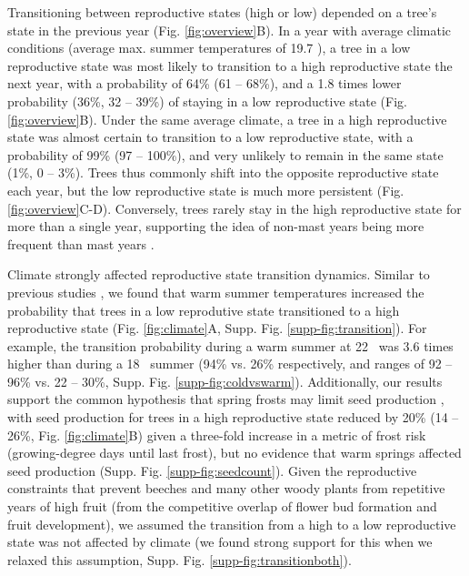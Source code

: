 \documentclass[11pt]{article}
\begin{document}
Transitioning between reproductive states (high or low) depended on a tree's state in the previous year (Fig. \ref{fig:overview}B).  In a year with average climatic conditions (average max. summer temperatures of 19.7 \celsius), a tree in a low reproductive state was most likely to transition to a high reproductive state the next year, with a probability of 64\% (61 -- 68\%), and a 1.8 times lower probability (36\%, 32 -- 39\%) of staying in a low reproductive state (Fig. \ref{fig:overview}B).
Under the same average climate, a tree in a high reproductive state was almost certain to transition to a low reproductive state, with a probability of 99\% (97 -- 100\%), and very unlikely to remain in the same state (1\%, 0 -- 3\%). 
Trees thus commonly shift into the opposite reproductive state each year, but the low reproductive state is much more persistent (Fig. \ref{fig:overview}C-D). 
Conversely, trees rarely stay in the high reproductive state for more than a single year, supporting the idea of non-mast years being more frequent than mast years \citep{Kelly1994}. 

Climate strongly affected reproductive state transition dynamics. Similar to previous studies \citep{Nussbaumer2018, Vacchiano2017, Journe2024}, we found that warm summer temperatures increased the probability that trees in a low reprodutive state transitioned to a high reproductive state (Fig. \ref{fig:climate}A, Supp. Fig. \ref{supp-fig:transition}). For example, the transition probability during a warm summer at 22 \celsius ~was 3.6 times higher than during a 18 \celsius ~summer (94\% vs. 26\% respectively, and ranges of 92 -- 96\% vs. 22 -- 30\%, Supp. Fig. \ref{supp-fig:coldvswarm}). 
Additionally, our results support the common hypothesis that spring frosts may limit seed production \citep{Augspurger2009, Packham2012}, with seed production for trees in a high reproductive state reduced by 20\%  (14 -- 26\%, Fig. \ref{fig:climate}B) given a three-fold increase in a metric of frost risk (growing-degree days until last frost\citep{Vitasse2018}), but no evidence that warm springs affected seed production (Supp. Fig. \ref{supp-fig:seedcount}). 
Given the reproductive constraints that prevent beeches and many other woody plants from repetitive years of high fruit (from the competitive overlap of flower bud formation and fruit development\citep{Monselise1982, Geber1997}), we assumed the transition from a high to a low reproductive state was not affected by climate (we found strong support for this when we relaxed this assumption, Supp. Fig. \ref{supp-fig:transitionboth}). 
\end{document}
